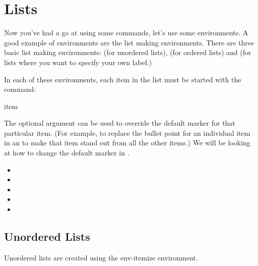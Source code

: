 
\section{Lists}
\label{sec:lists}

Now you've had a go at using some \glspl{command},
let's use some \glspl{environment}. A good example of environments are the list
making environments. There are three basic list making environments:
 (for unordered lists),
 (for ordered lists) and
 (for lists where you want to specify
your own label.)

In each of these environments, each item in the list must be started
with the command: 
\begin{definition}
\gls{item}
\end{definition}
The optional argument  can be used to override 
the default marker for that particular item. (For example, to replace
the bullet point for an individual item in an  to make that item stand out from all the other
items.) We will be looking at how to change the default marker
in .

\begin{itemize}
\item {}
\item {}
\item {}
\item {}
\item {}
\end{itemize}


\subsection{Unordered Lists}
\label{sec:itemize}

Unordered lists are created using the \gls{env-itemize} environment.


